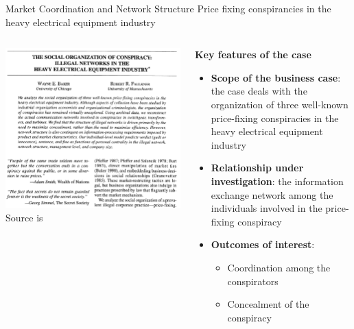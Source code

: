 \documentclass[notes, aspectratio=1610]{beamer}
\begin{document}
\begin{frame}{Market Coordination and Network Structure}
	{Price fixing conspirancies in the heavy electrical equipment industry}
	\centering
	\begin{columns}[c]
		\begin{column}{0.5\textwidth}
			\includegraphics[width=1\textwidth]{images/baker_faulkner.png}
			\small Source is~\cite{baker_faulkner_1993}
		\end{column}
		\begin{column}{0.5\textwidth}
			\begin{center}
			\textbf{Key features of the case}
			\end{center}
			\small
			\begin{itemize}
				\item 
				\textbf{Scope of the business case}: the 
				case deals with the organization of 
				three well-known price-fixing conspiracies in 
				the heavy electrical equipment industry 
				\item
				\textbf{Relationship under investigation}: the 
				information exchange network among the individuals 
				involved in the price-fixing conspiracy 
				\item
				\textbf{Outcomes of interest}:
				\begin{itemize}
					\item Coordination among the conspirators
					\item Concealment of the conspiracy
				\end{itemize}
			\end{itemize}
		\end{column}
	\end{columns}
\end{frame}
\end{document}
